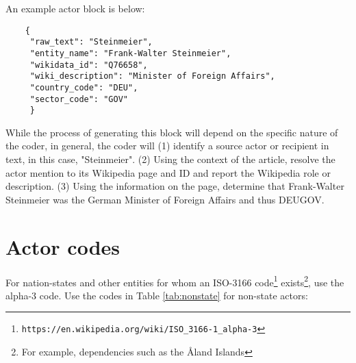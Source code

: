 \documentclass[11pt]{report}
\newcommand{\txt}[1]{\texttt{#1}}
\newcommand{\fn}[1]{\footnote{#1}}
\begin{document}
An example actor block is below:

\begin{verbatim}
	{
	 "raw_text": "Steinmeier",
	 "entity_name": "Frank-Walter Steinmeier",
	 "wikidata_id": "Q76658",
	 "wiki_description": "Minister of Foreign Affairs",
	 "country_code": "DEU",
	 "sector_code": "GOV"
	 }
\end{verbatim}

While the process of generating this block will depend on the specific nature of the coder, in general, the coder will (1) identify a source actor or recipient in text, in this case, "Steinmeier". (2) Using the context of the article, resolve the actor mention to its Wikipedia page and ID and report the Wikipedia role or description. (3) Using the information on the page, determine that Frank-Walter Steinmeier was the German Minister of Foreign Affairs and thus DEUGOV.



\section{Actor codes}

For nation-states and other entities for whom an ISO-3166 code\fn{\txt{https://en.wikipedia.org/wiki/ISO\_3166-1\_alpha-3}} exists\fn{For example, dependencies such as the \AA land Islands}, use the alpha-3 code. Use the codes in Table \ref{tab:nonstate} for non-state actors:
\end{document}
